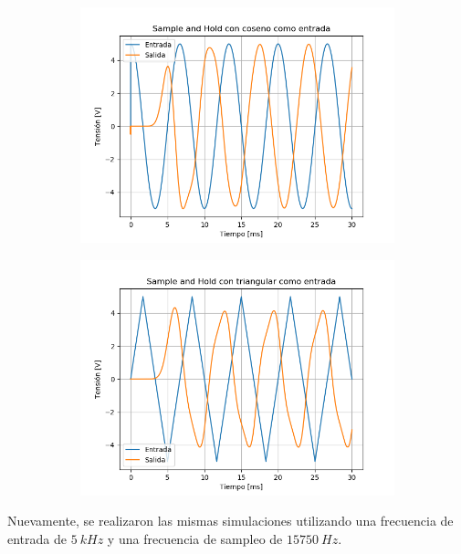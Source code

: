 \begin{figure}[H]
	\begin{subfigure}{.5\textwidth}
	\centering
	\includegraphics[width=\textwidth]{ImagenesEjercicio6/SH - Cos.png}
	\end{subfigure}
	\begin{subfigure}{.5\textwidth}
	\centering
	\includegraphics[width=\textwidth]{ImagenesEjercicio6/SH - Tri.png}
	\end{subfigure}
\end{figure}

Nuevamente, se realizaron las mismas simulaciones utilizando una frecuencia de entrada de $5 \ kHz$ y una frecuencia de sampleo de $15750 \ Hz$.

